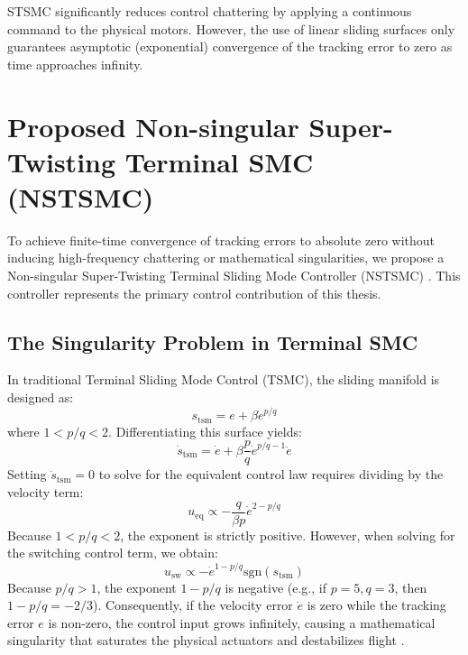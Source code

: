 STSMC significantly reduces control chattering by applying a continuous command to the physical motors. However, the use of linear sliding surfaces only guarantees asymptotic (exponential) convergence of the tracking error to zero as time approaches infinity.

\section{Proposed Non-singular Super-Twisting Terminal SMC (NSTSMC)}
To achieve finite-time convergence of tracking errors to absolute zero without inducing high-frequency chattering or mathematical singularities, we propose a Non-singular Super-Twisting Terminal Sliding Mode Controller (NSTSMC) \cite{ref_75}. This controller represents the primary control contribution of this thesis.

\subsection{The Singularity Problem in Terminal SMC}
In traditional Terminal Sliding Mode Control (TSMC), the sliding manifold is designed as:
\begin{equation}
s_{\text{tsm}} = e + \beta \dot{e}^{p/q}
\end{equation}
where $1 < p/q < 2$. Differentiating this surface yields:
\begin{equation}
\dot{s}_{\text{tsm}} = \dot{e} + \beta \frac{p}{q} \dot{e}^{p/q - 1} \ddot{e}
\end{equation}
Setting $\dot{s}_{\text{tsm}} = 0$ to solve for the equivalent control law requires dividing by the velocity term:
\begin{equation}
u_{\text{eq}} \propto -\frac{q}{\beta p} \dot{e}^{2 - p/q}
\end{equation}
Because $1 < p/q < 2$, the exponent is strictly positive. However, when solving for the switching control term, we obtain:
\begin{equation}
u_{\text{sw}} \propto -\dot{e}^{1 - p/q} \text{sgn}(s_{\text{tsm}})
\end{equation}
Because $p/q > 1$, the exponent $1 - p/q$ is negative (e.g., if $p=5, q=3$, then $1 - p/q = -2/3$). Consequently, if the velocity error $\dot{e}$ is zero while the tracking error $e$ is non-zero, the control input grows infinitely, causing a mathematical singularity that saturates the physical actuators and destabilizes flight \cite{ref_75}.

